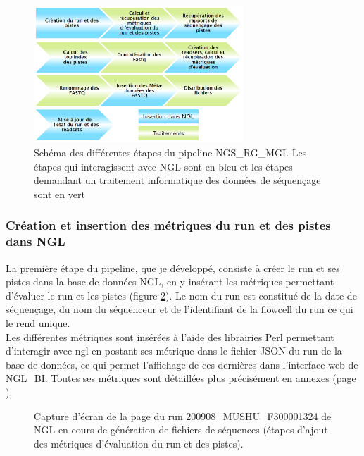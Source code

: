 \begin{figure}[H]
    \centering
    \includegraphics[width=0.7\textwidth]{img/schema-ngsrg-mgi.png}
    \caption{\footnotesize{Schéma des différentes étapes du pipeline NGS\_RG\_MGI. Les étapes qui interagissent avec NGL sont en bleu et les étapes demandant un traitement informatique des données de séquençage sont en vert}}
    \label{schema-ngsrg-mgi}
\end{figure}

\subsubsection*{Création et insertion des métriques du run et des pistes dans NGL }
La première étape du pipeline, que je développé, consiste à créer le run et ses pistes dans la base de données NGL, en y insérant les métriques permettant d'évaluer le run et les pistes (figure \ref{NGL-screenshot_run-lane}).
Le nom du run est constitué de la date de séquençage, du nom du séquenceur et de l'identifiant de la flowcell du run ce qui le rend unique.\\

Les différentes métriques sont insérées à l'aide des librairies Perl permettant d'interagir avec ngl en postant ses métrique dans le fichier JSON du run de la base de données, ce qui permet l'affichage de ces dernières dans l'interface web de NGL\_BI. Toutes ses métriques sont détaillées plus précisément en annexes (page \pageref{anexes1}).\\

\begin{figure}[H]
    \centering
    \caption{\footnotesize{Capture d'écran de la page du run 200908\_MUSHU\_F300001324 de NGL en cours de génération de fichiers de séquences (étapes d'ajout des métriques d'évaluation du run et des pistes).}}
    \label{NGL-screenshot_run-lane}
\end{figure}

